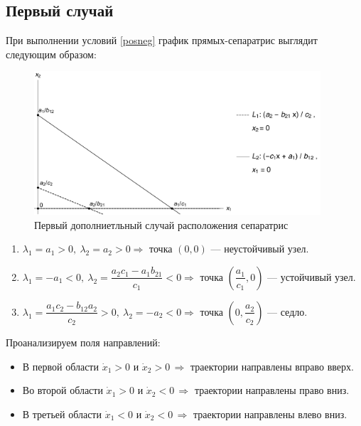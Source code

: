 \documentclass[12pt,a4paper]{article}
\begin{document}
    \subsection{Первый случай}
    При выполнении условий \eqref{posneg} график прямых-сепаратрис выглядит следующим образом:
    \begin{figure}[h]
        \centering
        \includegraphics[width=0.95\textwidth]{sep_3.pdf}
        \caption{Первый дополниетльный случай расположения сепаратрис}
        \label{fig:sep_3}
    \end{figure}
    \begin{enumerate}
        \setlength\itemsep{0.5em}
        \item $ \lambda_1 = a_1 > 0,\ \lambda_2 = a_2 > 0 \Rightarrow $ точка $ (0, 0) $ --- неустойчивый узел.
    
        \item $ \lambda_1 = -a_1 < 0,\ \lambda_2 = \dfrac{a_2 c_1 - a_1 b_{21}}{c_1} < 0 \Rightarrow $ точка $ \left( \dfrac{a_1}{c_1}, 0 \right) $ --- устойчивый узел.
        
        \item  $ \lambda_1 = \dfrac{a_1 c_2 - b_{12} a_2}{c_2} > 0,\ \lambda_2 = -a_2 < 0 \Rightarrow $ точка $ \left( 0, \dfrac{a_2}{c_2} \right) $ --- седло.
        \\[0.05em]
    \end{enumerate}

    Проанализируем поля направлений:

    \begin{itemize}
        \setlength\itemsep{0.4em}
        \item В первой области $ \dot x_1 > 0 $ и $ \dot x_2 > 0 \, \Rightarrow $ траектории направлены вправо вверх.
        \item Во второй области $ \dot x_1 > 0 $ и $ \dot x_2 < 0 \, \Rightarrow $ траектории направлены право вниз.
        \item В третьей области $ \dot x_1 < 0 $ и $ \dot x_2 < 0 \, \Rightarrow $ траектории направлены влево вниз.
    \end{itemize}
\end{document}
